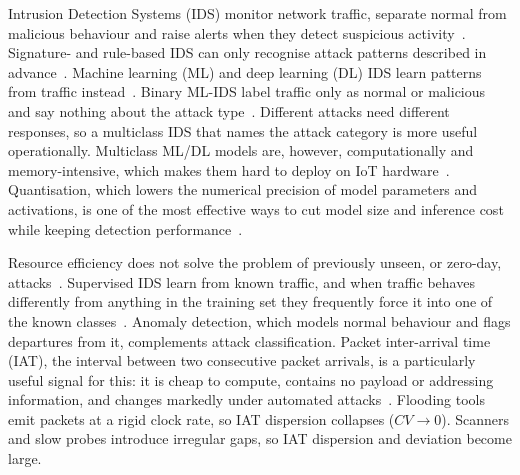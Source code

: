 \documentclass[]{interact}
\theoremstyle{plain}
\theoremstyle{definition}
\begin{document}
Intrusion Detection Systems (IDS) monitor network traffic, separate normal from malicious behaviour and raise alerts when they detect suspicious activity~\citep{abdulganiyu2023}. Signature- and rule-based IDS can only recognise attack patterns described in advance~\citep{khraisat2019}. Machine learning (ML) and deep learning (DL) IDS learn patterns from traffic instead~\citep{rakine2025}. Binary ML-IDS label traffic only as normal or malicious and say nothing about the attack type~\citep{palshikar2022}. Different attacks need different responses, so a multiclass IDS that names the attack category is more useful operationally. Multiclass ML/DL models are, however, computationally and memory-intensive, which makes them hard to deploy on IoT hardware~\citep{mallidi2025,arshad2020}. Quantisation, which lowers the numerical precision of model parameters and activations, is one of the most effective ways to cut model size and inference cost while keeping detection performance~\citep{gholami2022,misrak2025}.

Resource efficiency does not solve the problem of previously unseen, or zero-day, attacks~\citep{elhusseini2024}. Supervised IDS learn from known traffic, and when traffic behaves differently from anything in the training set they frequently force it into one of the known classes~\citep{sabeel2021}. Anomaly detection, which models normal behaviour and flags departures from it, complements attack classification. Packet inter-arrival time (IAT), the interval between two consecutive packet arrivals, is a particularly useful signal for this: it is cheap to compute, contains no payload or addressing information, and changes markedly under automated attacks~\citep{sahin2025}. Flooding tools emit packets at a rigid clock rate, so IAT dispersion collapses ($CV\!\to\!0$). Scanners and slow probes introduce irregular gaps, so IAT dispersion and deviation become large.
\end{document}
